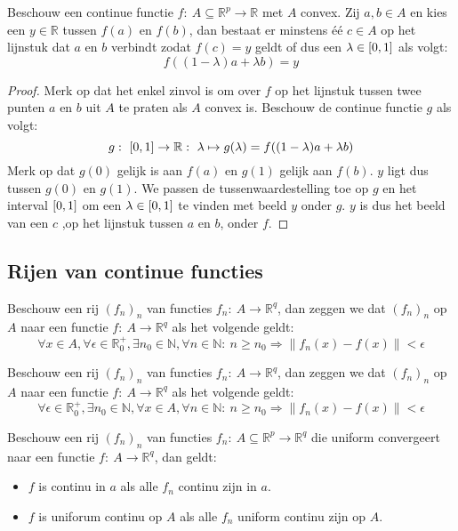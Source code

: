 \documentclass[main.tex]{subfiles}
\begin{document}
\begin{pr}
  Beschouw een continue functie $f:\ A \subseteq \mathbb{R}^{p} \rightarrow \mathbb{R}$ met $A$ convex.
  Zij $a,b\in A$ en kies een $y\in \mathbb{R}$ tussen $f(a)$ en $f(b)$, dan bestaat er minstens \'e\'e $c\in A$ op het lijnstuk dat $a$ en $b$ verbindt zodat $f(c) = y$ geldt of dus een $\lambda \in \interval{0}{1}$ als volgt:
  \[ f((1-\lambda)a+\lambda b) = y \]

  \begin{proof}
    Merk op dat het enkel zinvol is om over $f$ op het lijnstuk tussen twee punten $a$ en $b$ uit $A$ te praten als $A$ convex is.
    Beschouw de continue functie $g$ als volgt:
    \[ g:\ \interval{0}{1} \rightarrow \mathbb{R}:\ \lambda \mapsto g(\lambda) = f((1-\lambda)a+\lambda b) \]
    Merk op dat $g(0)$ gelijk is aan $f(a)$ en $g(1)$ gelijk aan $f(b)$.
    $y$ ligt dus tussen $g(0)$ en $g(1)$.
    We passen de tussenwaardestelling toe op $g$ en het interval $\interval{0}{1}$ om een $\lambda\in \interval{0}{1}$ te vinden met beeld $y$ onder $g$.
    $y$ is dus het beeld van een $c$ ,op het lijnstuk tussen $a$ en $b$, onder $f$.
  \end{proof}
\end{pr}

\subsection{Rijen van continue functies}
\label{sec:rijen-van-continue}

\begin{de}
  Beschouw een rij $(f_{n})_{n}$ van functies $f_{n}:\ A \rightarrow \mathbb{R}^{q}$, dan zeggen we dat $(f_{n})_{n}$  op $A$ naar een functie $f:\ A \rightarrow \mathbb{R}^{q}$ als het volgende geldt:
  \[ \forall x\in A, \forall \epsilon \in \mathbb{R}_{0}^{+}, \exists n_{0} \in \mathbb{N}, \forall n \in \mathbb{N}:\ n \ge n_{0} \Rightarrow \|f_{n}(x) -f(x)\| < \epsilon \]
\end{de}

\begin{de}
  Beschouw een rij $(f_{n})_{n}$ van functies $f_{n}:\ A \rightarrow \mathbb{R}^{q}$, dan zeggen we dat $(f_{n})_{n}$  op $A$ naar een functie $f:\ A \rightarrow \mathbb{R}^{q}$ als het volgende geldt:
  \[ \forall \epsilon \in \mathbb{R}_{0}^{+}, \exists n_{0} \in \mathbb{N}, \forall x\in A, \forall n \in \mathbb{N}:\ n \ge n_{0} \Rightarrow \|f_{n}(x) -f(x)\| < \epsilon \]
\end{de}

\begin{st}
  Beschouw een rij $(f_{n})_{n}$ van functies $f_{n}:\ A \subseteq \mathbb{R}^{p} \rightarrow \mathbb{R}^{q}$ die uniform convergeert naar een functie $f:\ A \rightarrow \mathbb{R}^{q}$, dan geldt:
  \begin{itemize}
  \item $f$ is continu in $a$ als alle $f_n$ continu zijn in $a$.
  \item $f$ is uniforum continu op $A$ als alle $f_n$ uniform continu zijn op $A$.
  \end{itemize}
\end{st}
\end{document}
